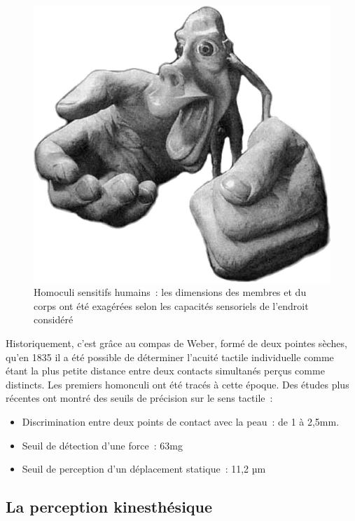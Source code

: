 \documentclass[
]{book}
\providecommand{\tightlist}{%
  \setlength{\itemsep}{0pt}\setlength{\parskip}{0pt}}
\begin{document}
\begin{figure}
\centering
\includegraphics{img/homonculus.png}
\caption{\label{fig:homb}Homoculi sensitifs humains~: les dimensions des membres et du corps ont été
exagérées selon les capacités sensoriels de l'endroit
considéré}
\end{figure}

Historiquement, c'est grâce au compas de Weber, formé de deux pointes
sèches, qu'en 1835 il a été possible de déterminer l'acuité tactile
individuelle comme étant la plus petite distance entre deux contacts
simultanés perçus comme distincts. Les premiers homonculi ont été tracés à
cette époque. Des études plus récentes ont montré des seuils de précision sur
le sens tactile~:

\begin{itemize}
\tightlist
\item
  Discrimination entre deux points de contact avec la
  peau~: de 1 à 2,5mm.
\item
  Seuil de détection d'une force~: 63mg
\item
  Seuil de perception d'un déplacement statique~: 11,2
  µm
\end{itemize}

\hypertarget{la-perception-kinesthuxe9sique}{%
\subsection{La perception kinesthésique}\label{la-perception-kinesthuxe9sique}}
\end{document}

